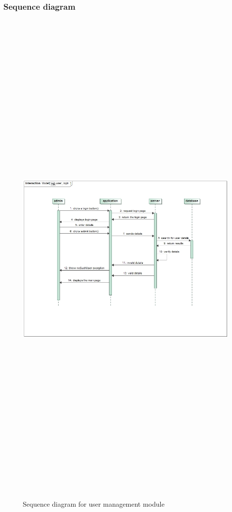 \subsubsection{Sequence diagram}
\begin{figure}[H]
	\includegraphics[width=12cm,height=26cm,keepaspectratio]{Users/Pictures/user_sequence_diagram.png}
	\caption{Sequence diagram for user management module}\label{visina8}
\end{figure}

